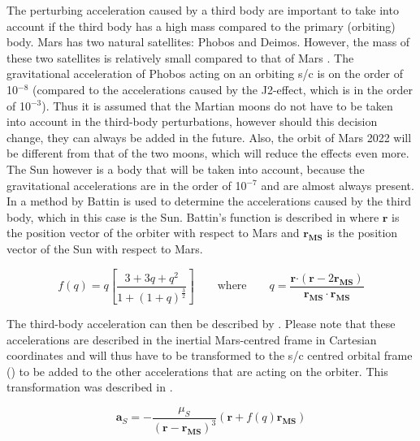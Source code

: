 
The perturbing acceleration caused by a third body are important to take into account if the third body has a high mass compared to the primary (orbiting) body. Mars has two natural satellites: Phobos and Deimos. However, the mass of these two satellites is relatively small compared to that of Mars \cite{williams2015}. The gravitational acceleration of Phobos acting on an orbiting \ac{s/c} is on the order of 10$^{-8}$ (compared to the accelerations caused by the J2-effect, which is in the order of 10$^{-3}$). Thus it is assumed that the Martian moons do not have to be taken into account in the third-body perturbations, however should this decision change, they can always be added in the future. Also, the orbit of Mars 2022 will be different from that of the two moons, which will reduce the effects even more. The Sun however is a body that will be taken into account, because the gravitational accelerations are in the order of 10$^{-7}$ and are almost always present. In \cite{gebbett2014multi} a method by Battin \cite{battin1999introduction} is used to determine the accelerations caused by the third body, which in this case is the Sun. Battin's function is described in  where $\mathbf{r}$ is the position vector of the orbiter with respect to Mars and $\mathbf{r_{MS}}$ is the position vector of the Sun with respect to Mars.


\begin{equation} \label{eq:battin}
f\left(q\right)=q\left[\dfrac{3+3q+q^{2}}{1+\left(1+q\right)^{\frac{3}{2}}}\right] \qquad \text{where} \qquad q=\dfrac{\mathbf{r} \mathbf{\cdot}\left(\mathbf{r}-2\mathbf{r_{MS}}\right)}{\mathbf{r_{MS}\cdot r_{MS}}}
\end{equation}

The third-body acceleration can then be described by . Please note that these accelerations are described in the inertial Mars-centred frame in Cartesian coordinates and will thus have to be transformed to the \ac{s/c} centred orbital frame () to be added to the other accelerations that are acting on the orbiter. This transformation was described in .

\begin{equation} \label{eq:third_b_per}
\mathbf{a}_{S}=-\dfrac{\mu_{S}}{\left(\mathbf{r}-\mathbf{r_{MS}}\right)^{3}}\left(\mathbf{r}+f\left(q\right)\mathbf{r_{MS}}\right)
\end{equation}

